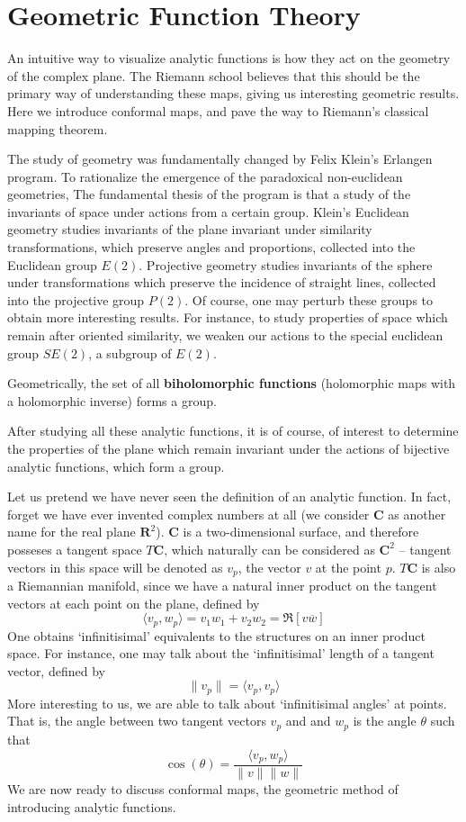 \chapter{Geometric Function Theory}

An intuitive way to visualize analytic functions is how they act on the geometry of the complex plane. The Riemann school believes that this should be the primary way of understanding these maps, giving us interesting geometric results. Here we introduce conformal maps, and pave the way to Riemann's classical mapping theorem.

The study of geometry was fundamentally changed by Felix Klein's Erlangen program. To rationalize the emergence of the paradoxical non-euclidean geometries, The fundamental thesis of the program is that a study of the invariants of space under actions from a certain group. Klein's Euclidean geometry studies invariants of the plane invariant under similarity transformations, which preserve angles and proportions, collected into the Euclidean group $E(2)$. Projective geometry studies invariants of the sphere under transformations which preserve the incidence of straight lines, collected into the projective group $P(2)$. Of course, one may perturb these groups to obtain more interesting results. For instance, to study properties of space which remain after oriented similarity, we weaken our actions to the special euclidean group $SE(2)$, a subgroup of $E(2)$.

Geometrically, the set of all {\bf biholomorphic functions} (holomorphic maps with a holomorphic inverse) forms a group.

After studying all these analytic functions, it is of course, of interest to determine the properties of the plane which remain invariant under the actions of bijective analytic functions, which form a group.

Let us pretend we have never seen the definition of an analytic function. In fact, forget we have ever invented complex numbers at all (we consider $\mathbf{C}$ as another name for the real plane $\mathbf{R}^2$). $\mathbf{C}$ is a two-dimensional surface, and therefore posseses a tangent space $T\mathbf{C}$, which naturally can be considered as $\mathbf{C}^2$ -- tangent vectors in this space will be denoted as $v_p$, the vector $v$ at the point $p$. $T\mathbf{C}$ is also a Riemannian manifold, since we have a natural inner product on the tangent vectors at each point on the plane, defined by
%
\[ \langle v_p, w_p \rangle = v_1 w_1 + v_2 w_2 = \Re[v\overline{w}] \]
%
One obtains `infinitisimal' equivalents to the structures on an inner product space. For instance, one may talk about the `infinitisimal' length of a tangent vector, defined by
%
\[ \| v_p \| = \langle v_p, v_p \rangle \]
%
More interesting to us, we are able to talk about `infinitisimal angles' at points. That is, the angle between two tangent vectors $v_p$ and and $w_p$ is the angle $\theta$ such that
%
\[ \cos(\theta) = \frac{\langle v_p, w_p \rangle}{\|v\| \|w\|} \]
%
We are now ready to discuss conformal maps, the geometric method of introducing analytic functions.

